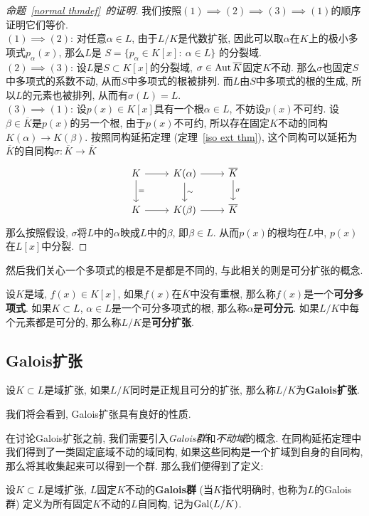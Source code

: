 \begin{proof}[命题~\ref{normal thmdef}~的证明]
    我们按照$(1)\implies(2)\implies(3)\implies(1)$的顺序证明它们等价.\\
    $(1)\implies(2)$: 对任意$\alpha\in L$, 由于$L/K$是代数扩张, 因此可以取$\alpha$在$K$上的极小多项式$p_\alpha(x)$, 那么$L$是
    \(S=\{p_\alpha\in K[x]:\ \alpha\in L\}\)
    的分裂域.\\
    $(2)\implies(3)$: 设$L$是$S\subset K[x]$的分裂域, $\sigma\in\operatorname{Aut}{\overline{K}}$固定$K$不动.
    那么$\sigma$也固定$S$中多项式的系数不动, 从而$S$中多项式的根被排列.
    而$L$由$S$中多项式的根的生成, 所以$L$的元素也被排列, 从而有$\sigma(L)=L$.\\
    $(3)\implies(1)$: 设$p(x)\in K[x]$具有一个根$\alpha\in L$, 不妨设$p(x)$不可约.
    设$\beta\in\overline{K}$是$p(x)$的另一个根, 由于$p(x)$不可约, 所以存在固定$K$不动的同构$K(\alpha)\to K(\beta)$.
    按照同构延拓定理 (定理~\ref{iso ext thm}), 这个同构可以延拓为$\overline{K}$的自同构$\sigma:\overline{K}\to\overline{K}$
    \[\begin{tikzcd}
        K \ar[d, "="] \ar[r] & K(\alpha) \ar[d, "\sim"] \ar[r] & \overline{K} \ar[d, "\sigma"]\\
        K \ar[r] & K(\beta) \ar[r] & \overline{K}
    \end{tikzcd}\]
    那么按照假设, $\sigma$将$L$中的$\alpha$映成$L$中的$\beta$, 即$\beta\in L$.
    从而$p(x)$的根均在$L$中, $p(x)$在$L[x]$中分裂.
\end{proof}

然后我们关心一个多项式的根是不是都是不同的, 与此相关的则是可分扩张的概念.
\begin{defn}
    设$K$是域, $f(x)\in K[x]$, 如果$f(x)$在$\overline{K}$中没有重根, 那么称$f(x)$是一个\textbf{可分多项式}.
    如果$K\subset L$, $\alpha\in L$是一个可分多项式的根, 那么称$\alpha$是\textbf{可分元}.
    如果$L/K$中每个元素都是可分的, 那么称$L/K$是\textbf{可分扩张}.
\end{defn}

\subsection{Galois扩张}

\begin{defn}
    设$K\subset L$是域扩张, 如果$L/K$同时是正规且可分的扩张, 那么称$L/K$为\textbf{Galois扩张}.
\end{defn}

我们将会看到, Galois扩张具有良好的性质.

在讨论Galois扩张之前, 我们需要引入\textit{Galois群}和\textit{不动域}的概念.
在同构延拓定理中我们得到了一类固定底域不动的域同构, 如果这些同构是一个扩域到自身的自同构, 那么将其收集起来可以得到一个群.
那么我们便得到了定义:
\begin{defn}
    设$K\subset L$是域扩张, $L$固定$K$不动的\textbf{Galois群} (当$K$指代明确时, 也称为$L$的Galois群) 定义为所有固定$K$不动的$L$自同构, 记为$\operatorname{Gal}(L/K)$.
\end{defn}


